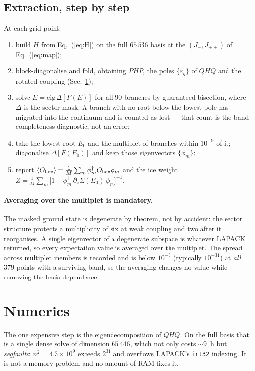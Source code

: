 \documentclass[11pt]{article}
\newcommand{\Jpm}{J_{\pm}}
\newcommand{\Jpmpm}{J_{\pm\pm}}
\newcommand{\Ohex}{O_{\rm hex}}
\begin{document}
\subsection{Extraction, step by step}

At each grid point:
\begin{enumerate}\itemsep2pt
\item build $H$ from Eq.~(\ref{eq:H}) on the full $65\,536$ basis at the
$(\Jpm,\Jpmpm)$ of Eq.~(\ref{eq:map});
\item block-diagonalise and fold, obtaining $PHP$, the poles
$\{\varepsilon_q\}$ of $QHQ$ and the rotated coupling
(Sec.~\ref{sec:klein});
\item solve $E=\mathrm{eig}\,\Delta[F(E)]$ for all $90$ branches by
guaranteed bisection, where $\Delta$ is the sector mask.  A branch with no
root below the lowest pole has migrated into the continuum and is counted
as lost --- that count is the band-completeness diagnostic, not an error;
\item take the lowest root $E_0$ and the multiplet of branches within
$10^{-9}$ of it; diagonalise $\Delta[F(E_0)]$ and keep those eigenvectors
$\{\phi_m\}$;
\item report $\langle\Ohex\rangle=\frac{1}{M}\sum_m\phi_m^\dagger \Ohex
\phi_m$ and the ice weight
$Z=\frac{1}{M}\sum_m\bigl[1-\phi_m^\dagger\,\partial_z\Sigma(E_0)\,
\phi_m\bigr]^{-1}$.
\end{enumerate}

\paragraph{Averaging over the multiplet is mandatory.}  The masked ground
state is degenerate by theorem, not by accident: the sector structure
protects a multiplicity of six at weak coupling and two after it
reorganises.  A single eigenvector of a degenerate subspace is whatever
LAPACK returned, so every expectation value is averaged over the multiplet.
The spread across multiplet members is recorded and is below $10^{-6}$
(typically $10^{-31}$) at \emph{all} $379$ points with a surviving band, so
the averaging changes no value while removing the basis dependence.

\section{Numerics}
\label{sec:klein}

The one expensive step is the eigendecomposition of $QHQ$.  On the full
basis that is a single dense solve of dimension $65\,446$, which not only
costs $\sim9$~h but \emph{segfaults}: $n^2=4.3\times10^9$ exceeds $2^{31}$
and overflows LAPACK's \texttt{int32} indexing.  It is not a memory
problem and no amount of RAM fixes it.
\end{document}
